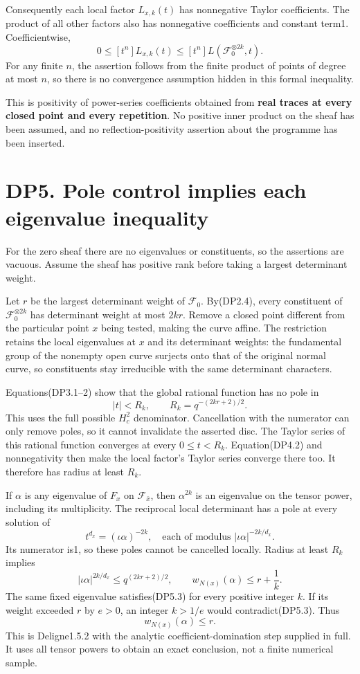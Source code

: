 \documentclass[
]{report}
\newcounter{none} %
\begin{document}
Consequently each local factor \(L_{x,k}(t)\) has nonnegative Taylor
coefficients. The product of all other factors also has nonnegative
coefficients and constant term1. Coefficientwise, \[
0\le[t^n]L_{x,k}(t)\le[t^n]L(\mathcal F_0^{\otimes2k},t).
\tag{DP4.2}
\] For any finite \(n\), the assertion follows from the finite product
of points of degree at most \(n\), so there is no convergence assumption
hidden in this formal inequality.

This is positivity of power-series coefficients obtained from
\textbf{real traces at every closed point and every repetition}. No
positive inner product on the sheaf has been assumed, and no
reflection-positivity assertion about the programme has been inserted.

\section{DP5. Pole control implies each eigenvalue
inequality}\label{dp5.-pole-control-implies-each-eigenvalue-inequality}

For the zero sheaf there are no eigenvalues or constituents, so the
assertions are vacuous. Assume the sheaf has positive rank before taking
a largest determinant weight.

Let \(r\) be the largest determinant weight of \(\mathcal F_0\).
By(DP2.4), every constituent of \(\mathcal F_0^{\otimes2k}\) has
determinant weight at most \(2kr\). Remove a closed point different from
the particular point \(x\) being tested, making the curve affine. The
restriction retains the local eigenvalues at \(x\) and its determinant
weights: the fundamental group of the nonempty open curve surjects onto
that of the original normal curve, so constituents stay irreducible with
the same determinant characters.

Equations(DP3.1--2) show that the global rational function has no pole
in \[
|t|<R_k,\qquad R_k=q^{-(2kr+2)/2}.
\tag{DP5.1}
\] This uses the full possible \(H_c^2\) denominator. Cancellation with
the numerator can only remove poles, so it cannot invalidate the
asserted disc. The Taylor series of this rational function converges at
every \(0\le t<R_k\). Equation(DP4.2) and nonnegativity then make the
local factor's Taylor series converge there too. It therefore has radius
at least \(R_k\).

If \(\alpha\) is any eigenvalue of \(F_x\) on \(\mathcal F_{\bar x}\),
then \(\alpha^{2k}\) is an eigenvalue on the tensor power, including its
multiplicity. The reciprocal local determinant has a pole at every
solution of \[
t^{d_x}=(\iota\alpha)^{-2k},
\quad\text{each of modulus }|\iota\alpha|^{-2k/d_x}.
\tag{DP5.2}
\] Its numerator is1, so these poles cannot be cancelled locally. Radius
at least \(R_k\) implies \[
|\iota\alpha|^{2k/d_x}\le q^{(2kr+2)/2},
\qquad
w_{N(x)}(\alpha)\le r+\frac1k.
\tag{DP5.3}
\] The same fixed eigenvalue satisfies(DP5.3) for every positive integer
\(k\). If its weight exceeded \(r\) by \(e>0\), an integer \(k>1/e\)
would contradict(DP5.3). Thus \[
\boxed{w_{N(x)}(\alpha)\le r.}
\tag{DP5.4}
\] This is Deligne1.5.2 with the analytic coefficient-domination step
supplied in full. It uses all tensor powers to obtain an exact
conclusion, not a finite numerical sample.
\end{document}
